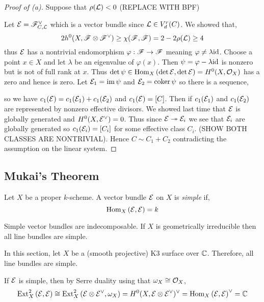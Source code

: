 \documentclass[12pt]{article}
\begin{document}
\begin{proof}[Proof of (a)]
Suppose that $\rho(\mathcal{L}) < 0$ (REPLACE WITH BPF)

Let $\mathcal{E} = \mathscr{F}_{C, \mathcal{L}}^\vee$ which is a vector bundle since $\mathcal{L} \in V^r_d(C)$. We showed that,
\[ 2 h^0(X, \mathscr{F} \otimes \mathscr{F}^\vee) \ge \chi(\mathscr{F}, \mathscr{F}) = 2 - 2 \rho(\mathcal{L}) \ge 4 \]
thus $\mathcal{E}$ has a nontrivial endomorphism $\varphi : \mathscr{F} \to \mathscr{F}$ meaning $\varphi \neq \lambda \mathrm{id}$. Choose a point $x \in X$ and let $\lambda$ be an eigenvalue of $\varphi(x)$. Then $\psi = \varphi - \lambda \mathrm{id}$ is nonzero but is not of full rank at $x$. Thus $\det{\psi} \in \mathrm{Hom}_{X} \left( \det{\mathcal{E}}, \det{\mathcal{E}} \right) = H^0(X, \mathcal{O}_{X})$ has a zero and hence is zero. Let $\mathcal{E}_1 = \operatorname{\mathrm{im}}{\psi}$ and $\mathcal{E}_2 = \operatorname{\mathrm{coker}}{\psi}$ so there is a sequence,
\begin{center}
\end{center}
so we have $c_1(\mathcal{E}) = c_1(\mathcal{E}_1) + c_1(\mathcal{E}_2)$ and $c_1(\mathcal{E}) = [C]$. Then if $c_1(\mathcal{E}_1)$ and $c_1(\mathcal{E}_2)$ are represented by nonzero effective divisors. We showed last time that $\mathcal{E}$ is globally generated and $H^0(X, \mathcal{E}^\vee) = 0$.  Thus since $\mathcal{E} \twoheadrightarrow \mathcal{E}_i$ we see that $\mathcal{E}_i$ are globally generated so $c_1(\mathcal{E}_i) = [C_i]$ for some effective class $C_i$. (SHOW BOTH CLASSES ARE NONTRIVIAL).
Hence $C \sim C_1 + C_2$ contradicting the assumption on the linear system. 
\end{proof}

\subsection{Mukai's Theorem}

\begin{defn}
Let $X$ be a proper $k$-scheme. A vector bundle $\mathcal{E}$ on $X$ is \textit{simple} if,
\[ \mathrm{Hom}_{X} \left( \mathcal{E}, \mathcal{E} \right) = k \]
\end{defn}

\begin{rmk}
Simple vector bundles are indecomposable. If $X$ is geometrically irreducible then all line bundles are simple.
\end{rmk}


In this section, let $X$ be a (smooth projective) K3 surface over $\mathbb{C}$. Therefore, all line bundles are simple.

\begin{rmk}
If $\mathcal{E}$ is simple, then by Serre duality using that $\omega_X \cong \mathcal{O}_{X}$,
\[ \mathrm{Ext}^{2}_{X} \left( \mathcal{E}, \mathcal{E} \right) \cong \mathrm{Ext}^{2}_{X} \left( \mathcal{E} \otimes \mathcal{E}^\vee, \omega_X \right) = H^0(X, \mathcal{E} \otimes \mathcal{E}^\vee)^\vee = \mathrm{Hom}_{X} \left( \mathcal{E}, \mathcal{E} \right)^\vee = \mathbb{C} \]
\end{rmk}
\end{document}
